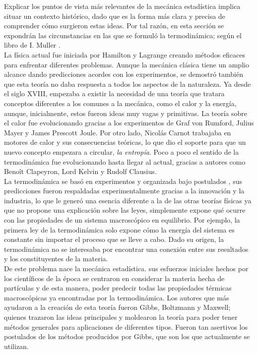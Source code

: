 Explicar los puntos de vista más relevantes de la mecánica estadística implica situar un contexto histórico, dado que es la forma más clara y precisa de comprender cómo surgieron estas ideas. Por tal razón, en esta sección se expondrán las circunstancias en las que se formuló la termodinámica; según el libro de I. Muller  \cite{MullerHistory}.
\\
La física actual fue iniciada por Hamilton y Lagrange creando métodos eficaces para enfrentar diferentes problemas. Aunque la mecánica clásica tiene un amplio alcance dando predicciones acordes con los experimentos, se demostró también que esta teoría no daba respuesta a todos los aspectos de la naturaleza. Ya desde el siglo XVIII, empezaba a existir la necesidad de una teoría que tratara conceptos diferentes a los comunes a la mecánica, como el calor y la energía, aunque, inicialmente, estos fueron ideas muy vagas y primitivas. La teoría sobre el calor fue evolucionando gracias a los experimentos de Graf von Rumford, Julius Mayer y James Prescott Joule. Por otro lado, Nicolás Carnot trabajaba en motores de calor y sus consecuencias teóricas, lo que dio el soporte para que un nuevo concepto empezara a circular, \textit{la entropía}. Poco a poco el sentido de la termodinámica fue evolucionando hasta llegar al actual, gracias a autores como Benoît Clapeyron, Lord Kelvin y Rudolf Clausius.
\\
La termodinámica se basó en experimentos y organizada bajo postulados \cite{CallenThermo}, sus predicciones fueron respaldadas experimentalmente gracias a la innovación y la industria, lo que le generó una esencia diferente a la de las otras teorías físicas ya que no propone una explicación sobre las leyes, simplemente expone qué ocurre con las propiedades de un sistema macroscópico en equilibrio. Por ejemplo, la primera ley de la termodinámica solo expone cómo la energía del sistema es constante sin importar el proceso que se lleve a cabo. Dado su origen, la termodinámica no se interesaba por encontrar una conexión entre sus resultados y los constituyentes de la materia.
\\
De este problema nace la mecánica estadística. sus esfuerzos iniciales hechos por los científicos de la época se centraron en considerar la materia hecha de partículas y de esta manera, poder predecir todas las propiedades térmicas macroscópicas ya encontradas por la termodinámica. Los autores que más ayudaron a la creación de esta teoría fueron Gibbs, Boltzmann y Maxwell; quienes trazaron las ideas principales y moldearon la teoría para poder tener métodos generales para aplicaciones de diferentes tipos. Fueron tan asertivos los postulados de los métodos producidos por Gibbs, que son los que actualmente se utilizan.
\\
\\
